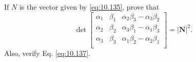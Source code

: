 \begin{myexercise}
    \label{ex:10.30}
    If $N$ is the vector given by \eqref{eq:10.135}, 
    prove that
    \begin{equation*}
        \det 
        \begin{bmatrix}
            \alpha_1 & \beta_1 & \alpha_2 \beta_3 - \alpha_3 \beta_2 \\
            \alpha_2 & \beta_2 & \alpha_3 \beta_1 - \alpha_1 \beta_3 \\
            \alpha_3 & \beta_3 & \alpha_1 \beta_2 - \alpha_2 \beta_1 \\
        \end{bmatrix} = 
        \left| \mathbf{N} \right|^2 .
    \end{equation*}
    Also, verify Eq. \eqref{eq:10.137}.
\end{myexercise}


\begin{myexercise}
    \label{ex:10.31}
\end{myexercise}


\begin{myexercise}
    \label{ex:10.32}
\end{myexercise}


